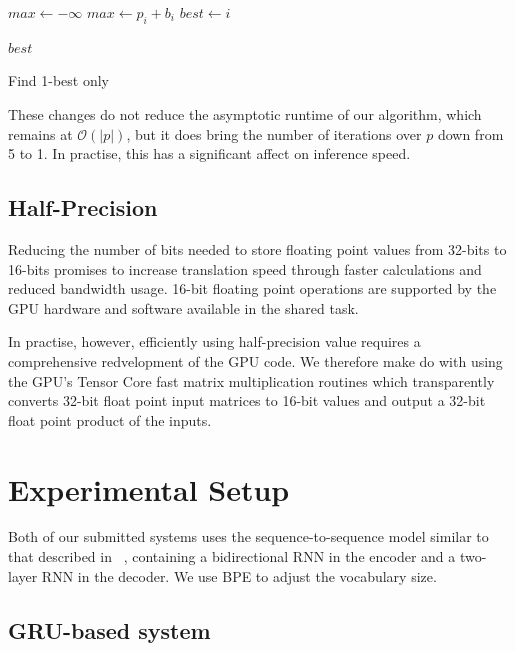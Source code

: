 \documentclass[11pt,a4paper]{article}
\begin{document}
\begin{algorithm}
\begin{algorithmic}

\State $max \gets - \infty$ 
    \State $max \gets p_i + b_i$
    \State $best \gets i$
  \EndIf
\EndFor

\Return $best$ 

\EndProcedure

\end{algorithmic}
\caption{Find 1-best only}
\label{algo:Argmax only}
\end{algorithm}

These changes do not reduce the asymptotic runtime of our algorithm, which remains at $\mathcal{O}(|p|)$, but it does bring the number of iterations over $p$ down from 5 to 1. In practise, this has a significant affect on inference speed.

\subsection{Half-Precision}

Reducing the number of bits needed to store floating point values from 32-bits to 16-bits promises to increase translation speed through faster calculations and reduced bandwidth usage. 16-bit floating point operations are supported by the GPU hardware and software available in the shared task.

In practise, however, efficiently using half-precision value requires a comprehensive redvelopment of the GPU code. We therefore make do with using the GPU's Tensor Core fast matrix multiplication routines which transparently converts 32-bit float point input matrices to 16-bit values and output a 32-bit float point product of the inputs.

\section{Experimental Setup}
\label{sec:Experimental Setup}

Both of our submitted systems uses the sequence-to-sequence model similar to that described in ~\citet{sennrich-haddow-birch:2016:P16-12}, containing a bidirectional RNN in the encoder and a two-layer RNN in the decoder. We use BPE to adjust the vocabulary size.

\subsection{GRU-based system}
\end{document}
